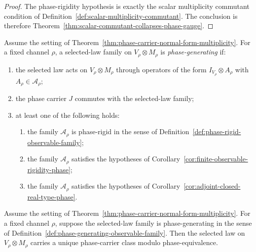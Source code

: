 \begin{proof}
The phase-rigidity hypothesis is exactly the scalar multiplicity commutant
condition of Definition~\ref{def:scalar-multiplicity-commutant}. The
conclusion is therefore Theorem~\ref{thm:scalar-commutant-collapses-phase-gauge}.
\end{proof}

\begin{definition}
\label{def:phase-generating-observable-family}
Assume the setting of
Theorem~\ref{thm:phase-carrier-normal-form-multiplicity}. For a fixed channel
$\rho$, a selected-law family on $V_{\rho}\otimes M_{\rho}$ is
\emph{phase-generating} if:
\begin{enumerate}[label=(\roman*), leftmargin=2em, itemsep=0.2em]
\item the selected law acts on $V_{\rho}\otimes M_{\rho}$ through operators of
      the form $I_{V_{\rho}}\otimes A_{\rho}$ with
      $A_{\rho}\in\mathcal A_{\rho}$;
\item the phase carrier $J$ commutes with the selected-law family;
\item at least one of the following holds:
      \begin{enumerate}[label=(\alph*), leftmargin=2em, itemsep=0.2em]
      \item the family $\mathcal A_{\rho}$ is phase-rigid in the sense of
            Definition~\ref{def:phase-rigid-observable-family};
      \item the family $\mathcal A_{\rho}$ satisfies the hypotheses of
            Corollary~\ref{cor:finite-observable-rigidity-phase};
      \item the family $\mathcal A_{\rho}$ satisfies the hypotheses of
            Corollary~\ref{cor:adjoint-closed-real-type-phase}.
      \end{enumerate}
\end{enumerate}
\end{definition}

\begin{theorem}
\label{thm:phase-generation-forces-phase-class}
Assume the setting of
Theorem~\ref{thm:phase-carrier-normal-form-multiplicity}. For a fixed channel
$\rho$, suppose the selected-law family is phase-generating in the sense of
Definition~\ref{def:phase-generating-observable-family}. Then the selected law
on $V_{\rho}\otimes M_{\rho}$ carries a unique phase-carrier class modulo
phase-equivalence.
\end{theorem}

